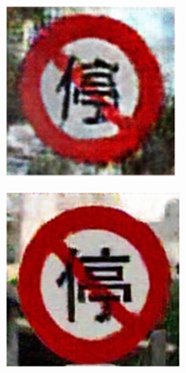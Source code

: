 \begin{figure}[h]
    \begin{subfigure}{0.125\textwidth}
        \centering
        \includegraphics[height=\textwidth]{../images/Taiwan Schilder/Generated4.png}
    \end{subfigure}
    \hspace{2em}%
    \begin{subfigure}{0.125\textwidth}
        \centering
        \includegraphics[height=\textwidth]{../images/Taiwan Schilder/Generated5.png}

\end{subfigure}
\end{figure}
